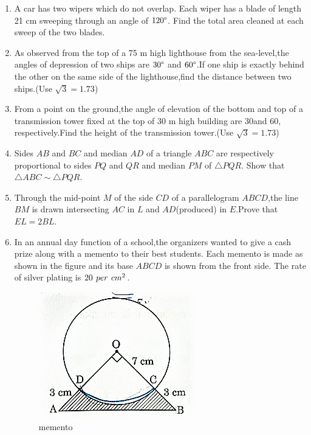 \documentclass{article}
\begin{document}
\begin{enumerate}
\item  A car has two wipers which do not overlap. Each wiper has a blade of length 21 cm sweeping through an angle of $120\degree$. Find the total area cleaned at each sweep of the two blades.

\item  As observed from the top of a 75 m high lighthouse from the sea-level,the angles of depression of two ships are $30\degree$ and $60\degree$.If one ship is exactly behind the other on the same side of the lighthouse,find the distance between two ships.(Use $\sqrt{3} = 1.73$)

\item  From a point on the ground,the angle of elevation of the bottom and top of a transmission tower fixed at the top of 30 m high building are 30\degree and 60\degree, respectively.Find the height of the transmission tower.(Use $\sqrt{3} = 1.73$)
    
\item Sides $AB$ and $BC$ and median $AD$ of a triangle $ABC$ are respectively proportional to sides $PQ$ and $QR$ and median $PM$ of $\triangle PQR$. Show that $\triangle ABC \sim \triangle PQR$. 

\item  Through the mid-point $M$ of the side $CD$ of a parallelogram $ABCD$,the line $BM$ is drawn intersecting $AC$ in $L$ and $AD$(produced) in $E$.Prove that $EL=2BL$.

\item  In an annual day function of a school,the organizers wanted to give a cash prize along with a memento to their best students. Each memento is made as shown in  the figure and its base $ABCD$ is shown from the front side. The rate of silver plating is \rupee \hspace{4 pt}$20 \hspace{4 pt} per \hspace{ 4 pt}  cm^2$.

\begin{figure}[h]
    \centering
    \includegraphics[width=0.5\columnwidth]{figs/30_2_1_Q36.png}
    \caption{memento}
    \label{fig:img2}
\end{figure}


\end{enumerate}
\end{document}
